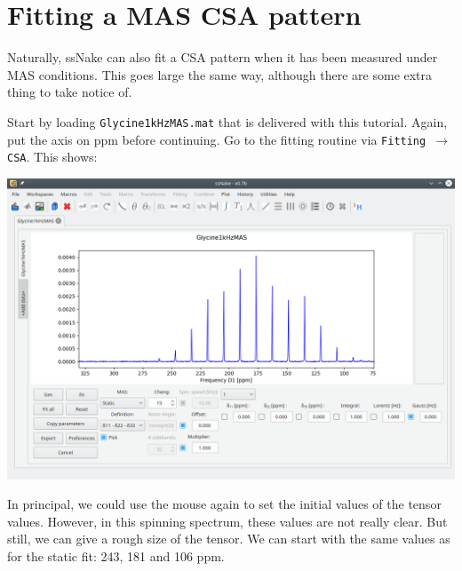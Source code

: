\documentclass[11pt,a4paper]{article}
\begin{document}
\section{Fitting a MAS CSA pattern}
Naturally, ssNake can also fit a CSA pattern when it has been measured under MAS conditions. This
goes large the same way, although there are some extra thing to take notice of.

Start by loading \texttt{Glycine1kHzMAS.mat} that is delivered with this tutorial. Again, put the
axis on ppm before continuing. Go to the fitting routine via \texttt{Fitting $\longrightarrow$ CSA}.
This shows:
\begin{center}
\includegraphics[width=0.8\linewidth]{Figs/Fig7.png}
\end{center}
In principal, we could use the mouse again to set the initial values of the tensor values. However,
in this spinning spectrum, these values are not really clear. But still, we can give a rough size of
the tensor. We can start with the same values as for the static fit: 243, 181 and 106 ppm.
\end{document}
